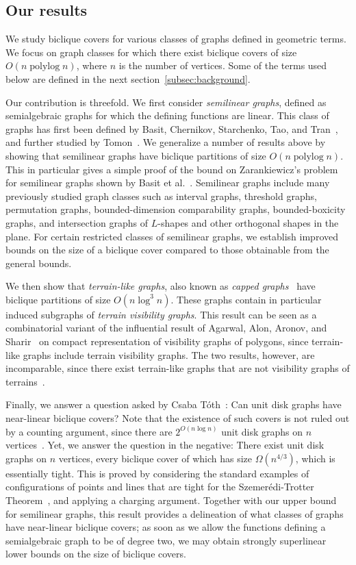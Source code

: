 \documentclass{amsart}
\newcommand{\darkblue}{\color{darkblue}} %
\newcommand{\defn}[1]{\textsl{\darkblue #1}} %
\DeclareMathOperator{\polylog}{\mathrm{polylog}}
\begin{document}
\subsection{Our results}

We study biclique covers for various classes of graphs defined in geometric terms. We focus on graph classes for which there exist biclique covers of size $O(n\polylog n)$, where $n$ is the number of vertices. Some of the terms used below are defined in the next section~\ref{subsec:background}.

Our contribution is threefold.
We first consider \defn{semilinear graphs}, defined as semialgebraic graphs for which the defining functions are linear. 
This class of graphs has first been defined by Basit, Chernikov, Starchenko, Tao, and Tran~\cite{BCSTT21}, and further studied by Tomon~\cite{T23}. 
We generalize a number of results above by showing that semilinear graphs have biclique partitions of size $O(n\polylog n)$. This in particular gives a simple proof of the bound on Zarankiewicz’s problem for semilinear graphs shown by Basit et al.~\cite{BCSTT21}.  
Semilinear graphs include many previously studied graph classes such as interval graphs, threshold graphs, permutation graphs, bounded-dimension comparability graphs, bounded-boxicity graphs, and intersection graphs of $L$-shapes and other orthogonal shapes in the plane. 
For certain restricted classes of semilinear graphs, we establish improved bounds on the size of a biclique cover compared to those obtainable from the general bounds. 

We then show that \defn{terrain-like graphs}, also known as \defn{capped graphs}~\cite{MR4562782} have biclique partitions of size $O(n\log^3 n)$. These graphs contain in particular induced subgraphs of \defn{terrain visibility graphs}.
This result can be seen as a combinatorial variant of the influential result of Agarwal, Alon, Aronov, and Sharir~\cite{MR1298916} on compact representation of visibility graphs of polygons, since terrain-like graphs include terrain visibility graphs. The two results, however, are incomparable, since there exist terrain-like graphs that are not visibility graphs of terrains~\cite{MR4117719}.

Finally, we answer a question asked by Csaba T\'oth~\cite{C23}: Can unit disk graphs have near-linear biclique covers? Note that the existence of such covers is not ruled out by a counting argument, since there are $2^{O(n\log n)}$ unit disk graphs on $n$ vertices~\cite{S21}.
Yet, we answer the question in the negative: There exist unit disk graphs on $n$ vertices, every biclique cover of which has size $\Omega (n^{4/3})$, which is essentially tight. This is proved by considering the standard examples of configurations of points and lines that are tight for the Szemer\'edi-Trotter Theorem~\cite{MR2177675}, and applying a charging argument.
Together with our upper bound for semilinear graphs, this result provides a delineation of what classes of graphs have near-linear biclique covers; as soon as we allow the functions defining a semialgebraic graph to be of degree two, we may obtain strongly superlinear lower bounds on the size of biclique covers.
\end{document}
